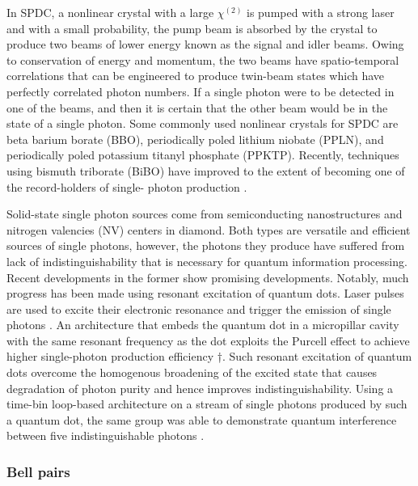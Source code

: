 \documentclass[aps,rmp,twocolumn,amsmath,amssymb,nofootinbib,superscriptaddress]{revtex4}
\begin{document}
In SPDC, a nonlinear crystal with a large $\chi^{(2)}$ is pumped with a strong 
laser and with a small probability, the pump beam is absorbed by the crystal to 
produce two beams of lower energy known as the signal and idler beams. Owing to 
conservation of energy and momentum, the two beams have spatio-temporal 
correlations that can be engineered to produce twin-beam states which have 
perfectly correlated photon numbers. If a single photon were to be detected in one 
of the beams, and then it is certain that the other beam would be in the state of a 
single photon. Some commonly used nonlinear crystals for SPDC are beta barium 
borate (BBO), periodically poled lithium niobate (PPLN), and periodically poled 
potassium titanyl phosphate (PPKTP). Recently, techniques using bismuth triborate 
(BiBO) have improved to the extent of becoming one of the record-holders of single-
photon production \cite{bib:WangChen16}.



Solid-state single photon sources come from semiconducting nanostructures and 
nitrogen valencies (NV) centers in diamond. Both types are versatile and efficient 
sources of single photons, however, the photons they produce have suffered from 
lack of indistinguishability that is necessary for quantum information processing.
Recent developments in the former show promising developments. Notably, much 
progress has been made using resonant excitation of quantum dots. Laser pulses are 
used to excite their electronic resonance and trigger the emission of single 
photons \cite{bib:Muller07,bib:Vamivakas09, bib:Flagg09,bib:Ates09, bib:Dirk10,
bib:1748,bib:Jayakumar13,bib:Wei14,bib:Muller14,bib:Unsleber15,
bib:237403,bib:Sweeney14}. An architecture that embeds the quantum dot in a 
micropillar cavity with the same resonant frequency as the dot exploits the 
Purcell effect to achieve higher single-photon production efficiency 
†\cite{bib:Ding16,bib:213601}. 
Such resonant excitation of quantum dots overcome the homogenous broadening of the 
excited state that causes degradation of photon purity and hence improves
indistinguishability. Using a time-bin loop-based architecture \cite{bib:Motes14} 
on a stream of single photons produced by such a quantum dot, the same group was 
able to demonstrate quantum interference between five indistinguishable photons 
\cite{bib:WangChen16}.



\subsubsection{Bell pairs}
\end{document}
